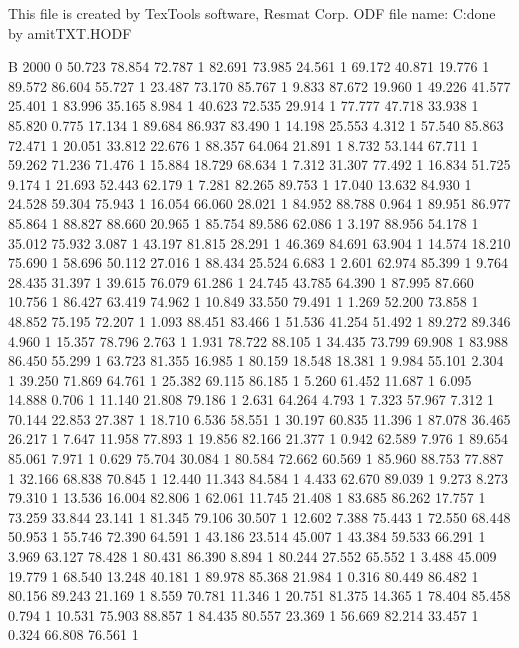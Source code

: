 This file is created by TexTools software, Resmat Corp.
ODF file name: C:\Users\Intel\Desktop\Texture done by amit\Sol TXT\solodf.HODF

B 2000 0
	50.723	78.854	72.787	1
	82.691	73.985	24.561	1
	69.172	40.871	19.776	1
	89.572	86.604	55.727	1
	23.487	73.170	85.767	1
	9.833	87.672	19.960	1
	49.226	41.577	25.401	1
	83.996	35.165	8.984	1
	40.623	72.535	29.914	1
	77.777	47.718	33.938	1
	85.820	0.775	17.134	1
	89.684	86.937	83.490	1
	14.198	25.553	4.312	1
	57.540	85.863	72.471	1
	20.051	33.812	22.676	1
	88.357	64.064	21.891	1
	8.732	53.144	67.711	1
	59.262	71.236	71.476	1
	15.884	18.729	68.634	1
	7.312	31.307	77.492	1
	16.834	51.725	9.174	1
	21.693	52.443	62.179	1
	7.281	82.265	89.753	1
	17.040	13.632	84.930	1
	24.528	59.304	75.943	1
	16.054	66.060	28.021	1
	84.952	88.788	0.964	1
	89.951	86.977	85.864	1
	88.827	88.660	20.965	1
	85.754	89.586	62.086	1
	3.197	88.956	54.178	1
	35.012	75.932	3.087	1
	43.197	81.815	28.291	1
	46.369	84.691	63.904	1
	14.574	18.210	75.690	1
	58.696	50.112	27.016	1
	88.434	25.524	6.683	1
	2.601	62.974	85.399	1
	9.764	28.435	31.397	1
	39.615	76.079	61.286	1
	24.745	43.785	64.390	1
	87.995	87.660	10.756	1
	86.427	63.419	74.962	1
	10.849	33.550	79.491	1
	1.269	52.200	73.858	1
	48.852	75.195	72.207	1
	1.093	88.451	83.466	1
	51.536	41.254	51.492	1
	89.272	89.346	4.960	1
	15.357	78.796	2.763	1
	1.931	78.722	88.105	1
	34.435	73.799	69.908	1
	83.988	86.450	55.299	1
	63.723	81.355	16.985	1
	80.159	18.548	18.381	1
	9.984	55.101	2.304	1
	39.250	71.869	64.761	1
	25.382	69.115	86.185	1
	5.260	61.452	11.687	1
	6.095	14.888	0.706	1
	11.140	21.808	79.186	1
	2.631	64.264	4.793	1
	7.323	57.967	7.312	1
	70.144	22.853	27.387	1
	18.710	6.536	58.551	1
	30.197	60.835	11.396	1
	87.078	36.465	26.217	1
	7.647	11.958	77.893	1
	19.856	82.166	21.377	1
	0.942	62.589	7.976	1
	89.654	85.061	7.971	1
	0.629	75.704	30.084	1
	80.584	72.662	60.569	1
	85.960	88.753	77.887	1
	32.166	68.838	70.845	1
	12.440	11.343	84.584	1
	4.433	62.670	89.039	1
	9.273	8.273	79.310	1
	13.536	16.004	82.806	1
	62.061	11.745	21.408	1
	83.685	86.262	17.757	1
	73.259	33.844	23.141	1
	81.345	79.106	30.507	1
	12.602	7.388	75.443	1
	72.550	68.448	50.953	1
	55.746	72.390	64.591	1
	43.186	23.514	45.007	1
	43.384	59.533	66.291	1
	3.969	63.127	78.428	1
	80.431	86.390	8.894	1
	80.244	27.552	65.552	1
	3.488	45.009	19.779	1
	68.540	13.248	40.181	1
	89.978	85.368	21.984	1
	0.316	80.449	86.482	1
	80.156	89.243	21.169	1
	8.559	70.781	11.346	1
	20.751	81.375	14.365	1
	78.404	85.458	0.794	1
	10.531	75.903	88.857	1
	84.435	80.557	23.369	1
	56.669	82.214	33.457	1
	0.324	66.808	76.561	1
